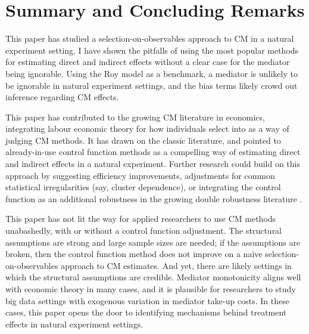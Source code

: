 \section{Summary and Concluding Remarks}
\label{sec:conclusion}

This paper has studied a selection-on-observables approach to CM in a natural experiment setting.
I have shown the pitfalls of using the most popular methods for estimating direct and indirect effects without a clear case for the mediator being ignorable.
Using the Roy model as a benchmark, a mediator is unlikely to be ignorable in natural experiment settings, and the bias terms likely crowd out inference regarding CM effects.

This paper has contributed to the growing CM literature in economics, integrating labour economic theory for how individuals select into as a way of judging CM methods.
It has drawn on the classic literature, and pointed to already-in-use control function methods as a compelling way of estimating direct and indirect effects in a natural experiment.
Further research could build on this approach by suggesting efficiency improvements, adjustments for common statistical irregularities (say, cluster dependence), or integrating the control function as an additional robustness in the growing double robustness literature \citep{huber2019review,bia2024double}.

This paper has not lit the way for applied researchers to use CM methods unabashedly, with or without a control function adjustment.
The structural assumptions are strong and large sample sizes are needed; if the assumptions are broken, then the control function method does not improve on a na\"ive selection-on-observables approach to CM estimates.
And yet, there are likely settings in which the structural assumptions are credible.
Mediator monotonicity aligns well with economic theory in many cases, and it is plausible for researchers to study big data settings with exogenous variation in mediator take-up costs.
In these cases, this paper opens the door to identifying mechanisms behind treatment effects in natural experiment settings.
